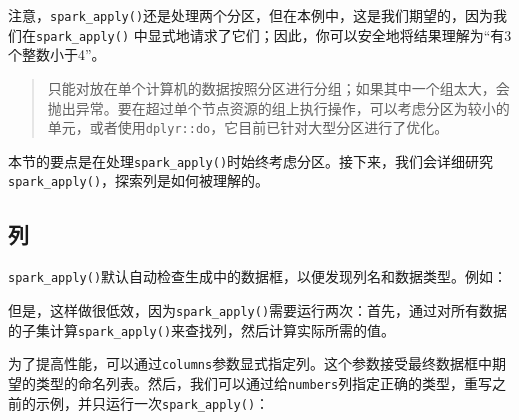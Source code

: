 \documentclass[
]{article}
\newenvironment{Shaded}{\begin{snugshade}}{\end{snugshade}}
\newcommand{\CommentTok}[1]{\textcolor[rgb]{0.56,0.35,0.01}{\textit{#1}}}
\newcommand{\DataTypeTok}[1]{\textcolor[rgb]{0.13,0.29,0.53}{#1}}
\newcommand{\DecValTok}[1]{\textcolor[rgb]{0.00,0.00,0.81}{#1}}
\newcommand{\ErrorTok}[1]{\textcolor[rgb]{0.64,0.00,0.00}{\textbf{#1}}}
\newcommand{\KeywordTok}[1]{\textcolor[rgb]{0.13,0.29,0.53}{\textbf{#1}}}
\newcommand{\NormalTok}[1]{#1}
\newcommand{\OperatorTok}[1]{\textcolor[rgb]{0.81,0.36,0.00}{\textbf{#1}}}
\newcommand{\StringTok}[1]{\textcolor[rgb]{0.31,0.60,0.02}{#1}}
\begin{document}
注意，\texttt{spark\_apply()}还是处理两个分区，但在本例中，这是我们期望的，因为我们在\texttt{spark\_apply()}
中显式地请求了它们；因此，你可以安全地将结果理解为``有3个整数小于4''。

\begin{quote}
只能对放在单个计算机的数据按照分区进行分组；如果其中一个组太大，会抛出异常。要在超过单个节点资源的组上执行操作，可以考虑分区为较小的单元，或者使用\texttt{dplyr::do}，它目前已针对大型分区进行了优化。
\end{quote}

本节的要点是在处理\texttt{spark\_apply()}时始终考虑分区。接下来，我们会详细研究\texttt{spark\_apply()}，探索列是如何被理解的。

\hypertarget{ux5217-1}{%
\subsection{列}\label{ux5217-1}}

\texttt{spark\_apply()}默认自动检查生成中的数据框，以便发现列名和数据类型。例如：

\begin{Shaded}
\end{Shaded}

但是，这样做很低效，因为\texttt{spark\_apply()}需要运行两次：首先，通过对所有数据的子集计算\texttt{spark\_apply()}来查找列，然后计算实际所需的值。

为了提高性能，可以通过\texttt{columns}参数显式指定列。这个参数接受最终数据框中期望的类型的命名列表。然后，我们可以通过给\texttt{numbers}列指定正确的类型，重写之前的示例，并只运行一次\texttt{spark\_apply()}：

\begin{Shaded}
\end{Shaded}
\end{document}
